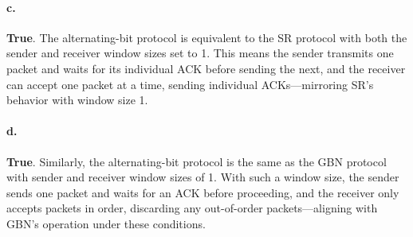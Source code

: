 \documentclass{cshwk}
\begin{document}
\paragraph{c.} \textbf{True}. The alternating-bit protocol is equivalent to the SR protocol with both the sender and receiver window sizes set to 1. This means the sender transmits one packet and waits for its individual ACK before sending the next, and the receiver can accept one packet at a time, sending individual ACKs—mirroring SR's behavior with window size 1.

\paragraph{d.} \textbf{True}. Similarly, the alternating-bit protocol is the same as the GBN protocol with sender and receiver window sizes of 1. With such a window size, the sender sends one packet and waits for an ACK before proceeding, and the receiver only accepts packets in order, discarding any out-of-order packets—aligning with GBN's operation under these conditions.
\end{document}
